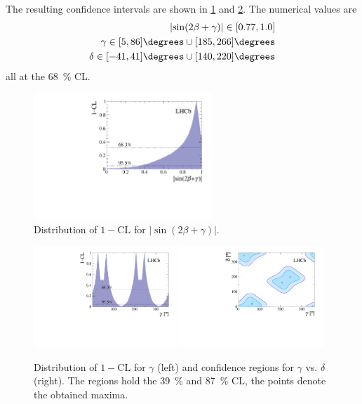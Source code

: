 The resulting confidence intervals are shown in \cref{fig:sin2betaplusGamma} and \ref{fig:GammaAndGammavsdelta}.
The numerical values are
\begin{align*}
\left|\sin\!\left(2\beta+\gamma\right)\right|\in[0.77, 1.0]\\
\gamma\in[5, 86]\degrees\cup[185, 266]\degrees\\
\delta\in[-41, 41]\degrees\cup[140, 220]\degrees\\
\end{align*}
all at the \SI{68}{\percent} CL.
\begin{figure}[tbp]
    \centering
    \includegraphics[width=0.6\textwidth]{11Result/figs/Sin2BetaPGamma.pdf}
    \caption{Distribution of $1-\text{CL}$ for $\left|\sin\!\left(2\beta+\gamma\right)\right|$.}
    \label{fig:sin2betaplusGamma}
\end{figure}
\begin{figure}[tbp]
    \centering
    \includegraphics[width=0.48\textwidth]{11Result/figs/Gamma.pdf}
    \includegraphics[width=0.48\textwidth]{11Result/figs/GammavsDelta.pdf}
    \caption{Distribution of $1-\text{CL}$ for $\gamma$ (left) and confidence regions for $\gamma$ vs. $\delta$ (right).
    The regions hold the \SI{39}{\percent} and \SI{87}{\percent} CL, the points denote the obtained maxima.}
    \label{fig:GammaAndGammavsdelta}
\end{figure}
